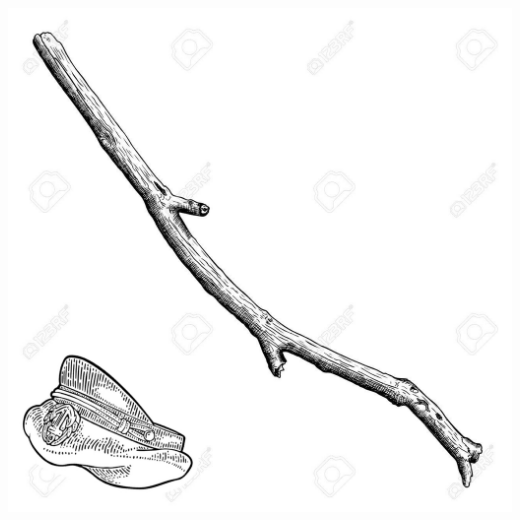 \vspace*{5mm}

\begin{center}
\includegraphics[width=\textwidth]{./content/img/xxx.jpg}
\begin{figure}[h]
\end{figure}
\end{center}

\clearpage